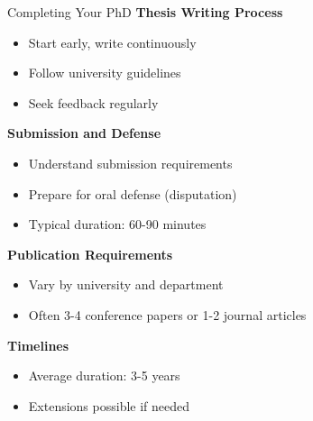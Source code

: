 \documentclass[aspectratio=169,10pt]{beamer}
\begin{document}
\begin{frame}{Completing Your PhD}
    \textbf{Thesis Writing Process}
    \begin{itemize}
        \item Start early, write continuously
        \item Follow university guidelines
        \item Seek feedback regularly
    \end{itemize}
    
    \textbf{Submission and Defense}
    \begin{itemize}
        \item Understand submission requirements
        \item Prepare for oral defense (disputation)
        \item Typical duration: 60-90 minutes
    \end{itemize}
    
    \textbf{Publication Requirements}
    \begin{itemize}
        \item Vary by university and department
        \item Often 3-4 conference papers or 1-2 journal articles
    \end{itemize}
    
    \textbf{Timelines}
    \begin{itemize}
        \item Average duration: 3-5 years
        \item Extensions possible if needed
    \end{itemize}
\end{frame}
\end{document}
